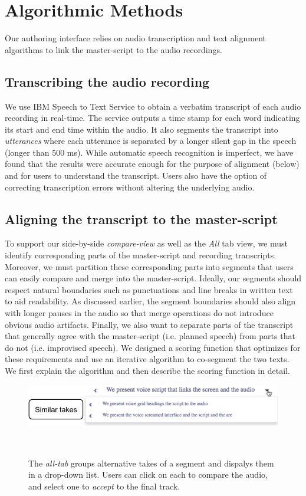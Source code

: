 \section{Algorithmic Methods}
\label{sec:algorithms}
Our authoring interface relies on audio transcription and text alignment algorithms to link the master-script to the audio recordings.  

\subsection{Transcribing the audio recording}
We use IBM Speech to Text Service \cite{ibmspeechtotext} to obtain a verbatim transcript of each audio recording in real-time. The service outputs a time stamp for each word indicating its start and end time within the audio. It also segments the transcript into \textit{utterances} where each utterance is separated by a longer silent gap in the speech (longer than 500 ms). While automatic speech recognition is imperfect, we have found that the results were accurate enough for the purpose of alignment (below) and for users to understand the transcript. Users also have the option of correcting transcription errors without altering the underlying audio.
  
\subsection{Aligning the transcript to the master-script}
To support our side-by-side \textit{compare-view} as well as the \textit{All} tab view, we must identify corresponding parts of the master-script and recording transcripts. Moreover, we must partition these corresponding parts into segments that users can easily compare and merge into the master-script. Ideally, our segments should respect natural boundaries such as punctuations and line breaks in written text to aid readability. As discussed earlier, the segment boundaries should also align with longer pauses in the audio so that merge operations do not introduce obvious audio artifacts. Finally, we also want to separate parts of the transcript that generally agree with the master-script (i.e. planned speech) from parts that do not (i.e. improvised speech).  We designed a scoring function that optimizes for these requirements and use an iterative algorithm to co-segment the two texts. We first explain the algorithm and then describe the scoring function in detail.
\begin{figure}
\centering
  \includegraphics[width=1.0\columnwidth]{figures/multipletakes}
  \caption{The \textit{all-tab} groups alternative takes of a segment and dispalys them in a drop-down list. Users can click on each to compare the audio, and select one to \textit{accept} to the final track.  }~\label{fig:multipletakes}
\end{figure}

